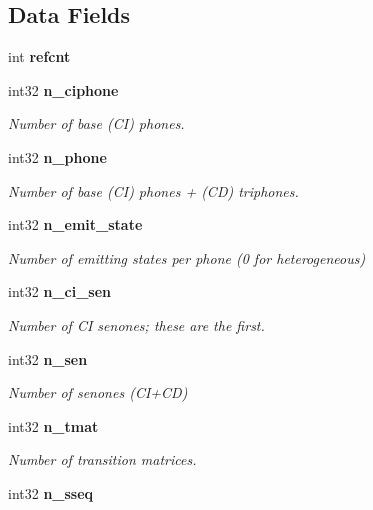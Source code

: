 \subsection*{Data Fields}
\begin{DoxyCompactItemize}
\item 
int {\bfseries refcnt}\label{structbin__mdef__s_a35282c2ff4e75fd87186e38dbf14e7f1}

\item 
int32 {\bf n\-\_\-ciphone}\label{structbin__mdef__s_a84d5f7acc6d85ba8c7611945f9c5e4e7}

\begin{DoxyCompactList}\small\item\em Number of base (C\-I) phones. \end{DoxyCompactList}\item 
int32 {\bf n\-\_\-phone}\label{structbin__mdef__s_ad746dbb3f8108f575a95182f96b4b18f}

\begin{DoxyCompactList}\small\item\em Number of base (C\-I) phones + (C\-D) triphones. \end{DoxyCompactList}\item 
int32 {\bf n\-\_\-emit\-\_\-state}\label{structbin__mdef__s_a2ad87254182be424ac6ff1234274f134}

\begin{DoxyCompactList}\small\item\em Number of emitting states per phone (0 for heterogeneous) \end{DoxyCompactList}\item 
int32 {\bf n\-\_\-ci\-\_\-sen}\label{structbin__mdef__s_ad7c318d6db85fd4b8ac13a81c145bbb8}

\begin{DoxyCompactList}\small\item\em Number of C\-I senones; these are the first. \end{DoxyCompactList}\item 
int32 {\bf n\-\_\-sen}\label{structbin__mdef__s_a3d1c202165d8e5e153a73d708ca28109}

\begin{DoxyCompactList}\small\item\em Number of senones (C\-I+\-C\-D) \end{DoxyCompactList}\item 
int32 {\bf n\-\_\-tmat}\label{structbin__mdef__s_a979557ad4f8369e84d93f633512345ca}

\begin{DoxyCompactList}\small\item\em Number of transition matrices. \end{DoxyCompactList}\item 
int32 {\bf n\-\_\-sseq}\label{structbin__mdef__s_ab9dad211cbc12eb6f848482bcf78d47f}


\end{DoxyCompactItemize}
